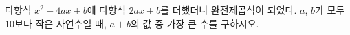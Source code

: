 다항식 $x^2-4ax+b$에 다항식 $2ax+b$를 더했더니 완전제곱식이 되었다. $a$, $b$가 모두 $10$보다 작은 자연수일 때, $a+b$의 값 중 가장 큰 수를 구하시오.
